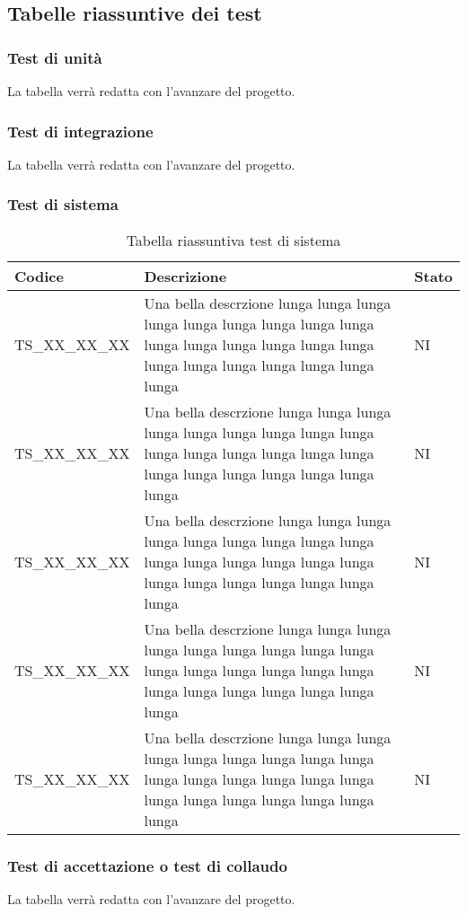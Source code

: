 \subsection{Tabelle riassuntive dei test}

\subsubsection{Test di unità}
La tabella verrà redatta con l'avanzare del progetto.

\subsubsection{Test di integrazione}
La tabella verrà redatta con l'avanzare del progetto.

\subsubsection{Test di sistema}
{

\centering
\renewcommand{\arraystretch}{2}
\begin{longtable}{C{3cm} C{10.2cm} C{1.5cm}}
\caption{Tabella riassuntiva test di sistema}\\
\textbf{Codice} &
\textbf{Descrizione}&
\textbf{Stato}\\
\endhead


TS\_XX\_XX\_XX & Una bella descrzione lunga lunga lunga lunga lunga lunga lunga lunga lunga lunga lunga lunga lunga lunga lunga lunga lunga lunga lunga lunga lunga lunga & NI\\
TS\_XX\_XX\_XX & Una bella descrzione lunga lunga lunga lunga lunga lunga lunga lunga lunga lunga lunga lunga lunga lunga lunga lunga lunga lunga lunga lunga lunga lunga & NI\\
TS\_XX\_XX\_XX & Una bella descrzione lunga lunga lunga lunga lunga lunga lunga lunga lunga lunga lunga lunga lunga lunga lunga lunga lunga lunga lunga lunga lunga lunga & NI\\
TS\_XX\_XX\_XX & Una bella descrzione lunga lunga lunga lunga lunga lunga lunga lunga lunga lunga lunga lunga lunga lunga lunga lunga lunga lunga lunga lunga lunga lunga & NI\\
TS\_XX\_XX\_XX & Una bella descrzione lunga lunga lunga lunga lunga lunga lunga lunga lunga lunga lunga lunga lunga lunga lunga lunga lunga lunga lunga lunga lunga lunga & NI\\

\end{longtable}


}
\subsubsection{Test di accettazione o test di collaudo}
La tabella verrà redatta con l'avanzare del progetto.